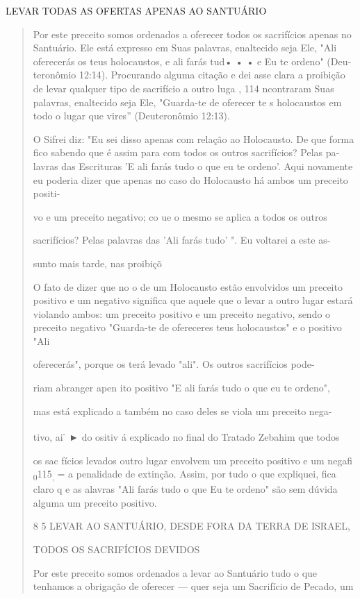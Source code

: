 LEVAR TODAS AS OFERTAS APENAS AO SANTUÁRIO

\begin{quote}
Por este preceito somos ordenados a oferecer todos os sacrifícios apenas
no Santuário. Ele está expresso em Suas palavras, enaltecido seja Ele,
"Ali oferecerás os teus holocaustos, e ali farás tud• • • e Eu te
ordeno" (Deu­teronômio 12:14). Procurando alguma citação e dei asse
clara a proibição de levar qualquer tipo de sacrifício a outro luga ,
114 ncontraram Suas pala­vras, enaltecido seja Ele, "Guarda-te de
oferecer te s holocaustos em todo o lugar que vires'' (Deuteronômio
12:13).

O Sifrei diz: "Eu sei disso apenas com relação ao Holocausto. De que
forma fico sabendo que é assim para com todos os outros sacrifícios?
Pelas pa­lavras das Escrituras 'E ali farás tudo o que eu te ordeno'.
Aqui novamente eu poderia dizer que apenas no caso do Holocausto há
ambos um preceito positi-

vo e um preceito negativo; co ue o mesmo se aplica a todos os outros

sacrifícios? Pelas palavras das 'Ali farás tudo' ". Eu voltarei a este
as-

sunto mais tarde, nas proibiçõ

O fato de dizer que no o de um Holocausto estão envolvidos um preceito
positivo e um negativo significa que aquele que o levar a outro lugar
estará violando ambos: um preceito positivo e um preceito negativo,
sendo o preceito negativo "Guarda-te de ofereceres teus holocaustos" e o
positivo "Ali

oferecerás", porque os terá levado "ali". Os outros sacrifícios pode-

riam abranger apen ito positivo "E ali farás tudo o que eu te ordeno",

mas está explicado a também no caso deles se viola um preceito nega-

tivo, ai\textsuperscript{-} ► do ositiv á explicado no final do Tratado
Zebahim que todos

os sac fícios levados outro lugar envolvem um preceito positivo e um
negafi \textsubscript{0}115\textsubscript{,} = a penalidade de extinção.
Assim, por tudo o que expliquei, fica claro q e as alavras "Ali farás
tudo o que Eu te ordeno" são sem dúvida algu­ma um preceito positivo.

8 5 LEVAR AO SANTUÁRIO, DESDE FORA DA TERRA DE ISRAEL,

TODOS OS SACRIFÍCIOS DEVIDOS

Por este preceito somos ordenados a levar ao Santuário tudo o que
tenhamos a obrigação de oferecer --- quer seja um Sacrifício de Pecado,
um
\end{quote}

